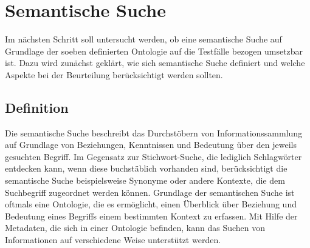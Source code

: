 \chapter{Semantische Suche}
Im nächsten Schritt soll untersucht werden, ob eine semantische Suche auf Grundlage der soeben definierten Ontologie auf die Testfälle bezogen umsetzbar ist. Dazu wird zunächst geklärt, wie sich semantische Suche definiert und welche Aspekte bei der Beurteilung berücksichtigt werden sollten.\\ 

\section{Definition}
Die semantische Suche beschreibt das Durchstöbern von Informationssammlung auf Grundlage von Beziehungen, Kenntnissen und Bedeutung über den jeweils gesuchten Begriff. Im Gegensatz zur Stichwort-Suche, die lediglich Schlagwörter entdecken kann, wenn diese buchstäblich vorhanden sind, berücksichtigt die semantische Suche beispielsweise Synonyme oder andere Kontexte, die dem Suchbegriff zugeordnet werden können.\newline
Grundlage der semantischen Suche ist oftmals eine Ontologie, die es ermöglicht, einen Überblick über Beziehung und Bedeutung eines Begriffs einem bestimmten Kontext zu erfassen. Mit Hilfe der Metadaten, die sich in einer Ontologie befinden, kann das Suchen von Informationen auf verschiedene Weise unterstützt werden.
\cite{Sack.2010}\newline

